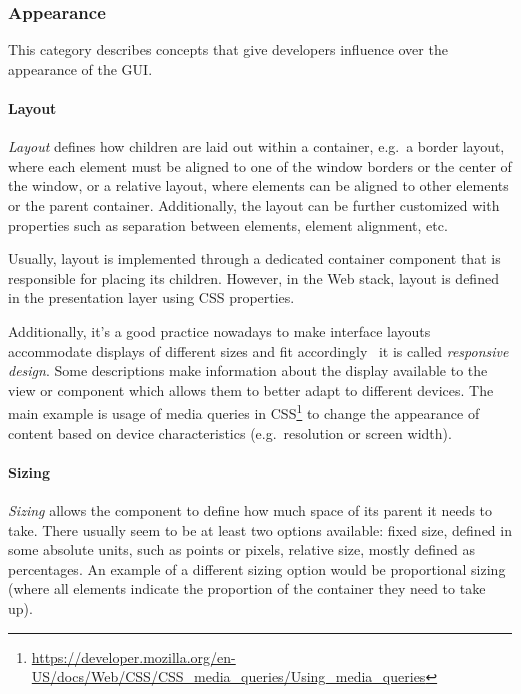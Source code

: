\subsubsection{Appearance}
This category describes concepts that give developers influence over the appearance of the GUI\@.

\paragraph{Layout}
\emph{Layout} defines how children are laid out within a container, e.g.\ a border layout, where each element must be aligned to one of the window borders or the center of the window, or a relative layout, where elements can be aligned to other elements or the parent container.
Additionally, the layout can be further customized with properties such as separation between elements, element alignment, etc.

Usually, layout is implemented through a dedicated container component that is responsible for placing its children.
However, in the Web stack, layout is defined in the presentation layer using CSS properties.

Additionally, it's a good practice nowadays to make interface layouts accommodate displays of different sizes and fit accordingly \textendash\ it is called \emph{responsive design}.
Some descriptions make information about the display available to the view or component which allows them to better adapt to different devices.
The main example is usage of media queries in CSS\footnote{\url{https://developer.mozilla.org/en-US/docs/Web/CSS/CSS_media_queries/Using_media_queries}} to change the appearance of content based on device characteristics (e.g.\ resolution or screen width).

\paragraph{Sizing}
\emph{Sizing} allows the component to define how much space of its parent it needs to take.
There usually seem to be at least two options available: fixed size, defined in some absolute units, such as points or pixels, relative size, mostly defined as percentages.
An example of a different sizing option would be proportional sizing (where all elements indicate the proportion of the container they need to take up).

